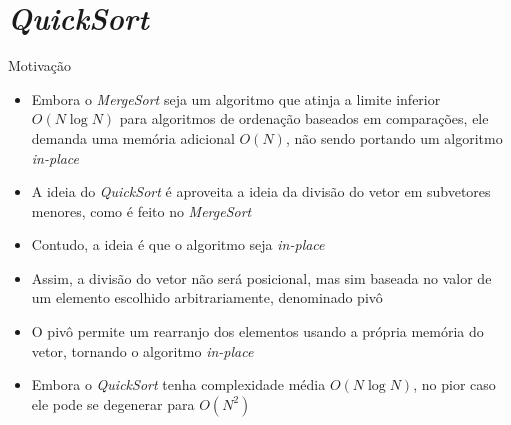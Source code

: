 \section{\it QuickSort}

\begin{frame}[fragile]{Motivação}

    \begin{itemize}
        \item Embora o \textit{MergeSort} seja um algoritmo que atinja a limite
            inferior $O(N\log N)$ para algoritmos de ordenação baseados em
            comparações, ele demanda uma memória adicional $O(N)$, não sendo portando
            um algoritmo \textit{in-place}

        \item A ideia do \textit{QuickSort} é aproveita a ideia da divisão do vetor em
            subvetores menores, como é feito no \textit{MergeSort}

        \item Contudo, a ideia é que o algoritmo seja \textit{in-place}

        \item Assim, a divisão do vetor não será posicional, mas sim baseada no valor de um
            elemento escolhido arbitrariamente, denominado pivô

        \item O pivô permite um rearranjo dos elementos usando a própria memória do vetor,
            tornando o algoritmo \textit{in-place}

        \item Embora o \textit{QuickSort} tenha complexidade média $O(N\log N)$, no pior caso
            ele pode se degenerar para $O(N^2)$
    \end{itemize}

\end{frame}

